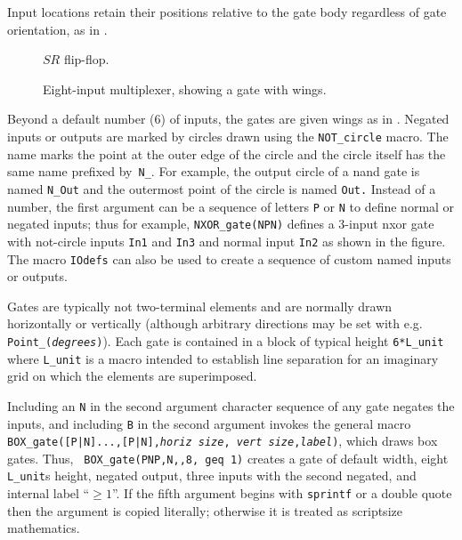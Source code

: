 Input locations retain their positions relative to the gate body
regardless of gate orientation, as in .
\begin{figure}[h!t]
   \vspace*{-\baselineskip}
   \parbox{4.75in}{\small }%
   
   \vspace*{-\baselineskip}
   \caption{$SR$ flip-flop.}
   \label{FF}
   \end{figure}
\begin{figure}[h!t]
   
   \caption{Eight-input multiplexer, showing a gate with wings.}
   \label{exVIII}
   \end{figure}
Beyond a default number (6) of inputs, the
gates are given wings as in .
Negated inputs or outputs are marked by circles drawn using the
\verb|NOT_circle| macro.  The name marks the point at the outer edge of the
circle and the circle itself has the same name prefixed by~{\tt N\_}.
For example, the output circle of a nand gate is named
{\tt N\_Out} and the outermost point of the circle is named {\tt Out.}
Instead of a number, the first argument can be a sequence of letters {\tt P}
or {\tt N} to define normal or negated inputs; thus for example,
{\tt NXOR\_gate(NPN)} defines a 3-input nxor gate with not-circle
inputs {\tt In1} and {\tt In3} and normal input {\tt In2}
as shown in the figure.
The macro {\tt IOdefs} can also be used to create a sequence of custom
named inputs or outputs.

Gates are typically not two-terminal elements and are normally drawn
horizontally or vertically (although arbitrary directions may be set
with e.g. {\tt Point\_({\sl degrees})}).
Each gate is contained in a
block of typical height {\tt 6*L\_unit} where {\tt L\_unit} is a macro
intended to establish line separation for an imaginary grid on which
the elements are superimposed.

Including an \verb|N| in the second
argument character sequence of any gate negates the inputs, and including
\verb|B| in the second argument invokes the
general macro {\tt BOX\_gate([P|N]...,[P|N],{\sl horiz size},{\sl
vert size},{\sl label})}, which draws box gates.  Thus, {\tt
BOX\_gate(PNP,N,,8, geq 1)} creates a gate of default width,
eight {\tt L\_unit}s height, negated output, three inputs with the
second negated, and internal label ``$\geq1$''.
If the fifth argument begins with {\tt sprintf} or a double quote then
the argument is copied literally; otherwise it is treated as scriptsize
mathematics.

